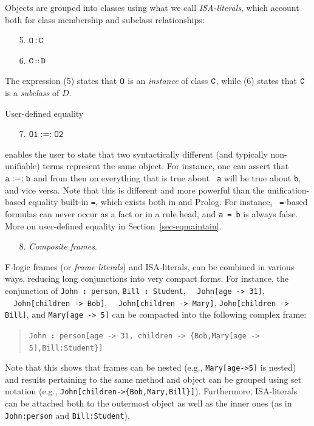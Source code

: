 \documentclass[11pt]{article}
\newcommand{\ERGO}{\mbox{\smaller{\ensuremath{\cal{E}}\smaller{{\sc{RGO}}}}}\xspace}
\newcommand{\FLSYSTEM}{\ERGO}
\newcommand{\isa}{\,{\bf{:}}\,}
\newcommand{\subcl}{\,{\bf{::}}\,}
\newcommand{\mvd}{{\mbox{\tt \,->\,}}}  %
\begin{document}
\begin{itemize}
  \medskip

  Objects are grouped into classes using what we call
  \emph{ISA-literals}, which account both for class membership and subclass
  relationships:

  \medskip

  \begin{enumerate}
  \item[5.] $\tt O\isa C$
  \item[6.] \label{eq-subclass} $\tt C\subcl D$
  \end{enumerate}

  The expression (5) states that $\tt O$ is an \emph{instance} of class $\tt C$,
  while (6) states that $\tt C$ is a \emph{subclass} of $D$.

  User-defined equality
  \begin{enumerate}
    \item[7.] $\tt O1 :=: O2$
  \end{enumerate}
  enables the user to state that two syntactically different (and typically
  non-unifiable) terms represent the same object. For instance, one can
  assert that $\tt a :=: b$ and from then on everything that is true about {\tt
  a}  will be true about {\tt b}, and vice versa. Note that this is
  different and more powerful than the unification-based equality built-in
  {\tt =}, which exists both in \FLSYSTEM and Prolog. For instance, {\tt
  =}-based formulas can never occur as a fact or in a rule head, and {\tt a =
  b} is always false.  More on user-defined equality in
  Section~\ref{sec-eqmaintain}.

  \begin{enumerate}
   \item[8.] \emph{Composite frames}.  
  \end{enumerate}
  F-logic frames (or \emph{frame literals}) and
  ISA-literals, can be combined in various ways, reducing long conjunctions
  into very compact forms.
  For instance, the conjunction of
  {\tt John{\isa}person}, \texttt{Bill{\isa}Student},~~ {\tt John[age{\mvd}31]},
  ~~{\tt John[children\mvd Bob]},
  ~~\texttt{John[children\mvd Mary]},
  \texttt{John[children\mvd Bill]}, and \texttt{Mary[age\mvd 5]}  
  can be compacted into the following complex frame:
  \begin{quote}
    {\tt John{\isa}person[age{\mvd}31, children\mvd\{Bob,Mary[age\mvd
      5],Bill:Student\}]} 
  \end{quote}
  Note that this shows that frames can be nested (e.g.,
  \texttt{Mary[age->5]} is nested) and results pertaining to
  the same method and object
  can be grouped using set notation (e.g.,
  \texttt{John[children->\{Bob,Mary,Bill\}]}). Furthermore, ISA-literals
  can be attached both to the outermost object as well as the inner ones
  (as in \texttt{John:person} and \texttt{Bill:Student}).  


\end{itemize}
\end{document}
